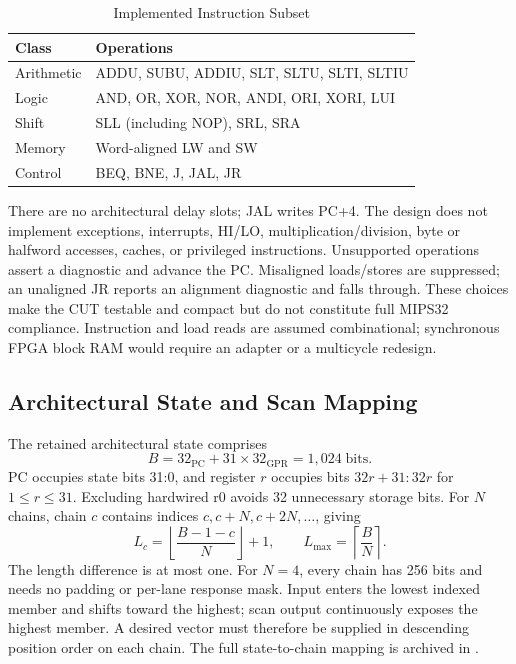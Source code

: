 \documentclass[conference,a4paper]{IEEEtran}
\newcommand{\rtl}[1]{\texttt{\detokenize{#1}}}
\begin{document}
\begin{table}[!t]
\caption{Implemented Instruction Subset}
\label{tab:isa}\centering\small
\begin{tabular}{@{}p{}p{}@{}}\toprule
Class & Operations \\\midrule
Arithmetic & ADDU, SUBU, ADDIU, SLT, SLTU, SLTI, SLTIU \\
Logic & AND, OR, XOR, NOR, ANDI, ORI, XORI, LUI \\
Shift & SLL (including NOP), SRL, SRA \\
Memory & Word-aligned LW and SW \\
Control & BEQ, BNE, J, JAL, JR \\\bottomrule
\end{tabular}
\end{table}

There are no architectural delay slots; JAL writes PC+4. The design does not
implement exceptions, interrupts, HI/LO, multiplication/division, byte or
halfword accesses, caches, or privileged instructions. Unsupported operations
assert a diagnostic and advance the PC. Misaligned loads/stores are suppressed;
an unaligned JR reports an alignment diagnostic and falls through. These choices
make the CUT testable and compact but do not constitute full MIPS32 compliance.
Instruction and load reads are assumed combinational; synchronous FPGA block
RAM would require an adapter or a multicycle redesign.

\subsection{Architectural State and Scan Mapping}
The retained architectural state comprises
\begin{equation}
 B=32_{\mathrm{PC}}+31\times32_{\mathrm{GPR}}=1,024\;\mathrm{bits}.
\end{equation}
PC occupies state bits 31:0, and register $r$ occupies bits $32r+31:32r$ for
$1\leq r\leq31$. Excluding hardwired r0 avoids 32 unnecessary storage bits.
For $N$ chains, chain $c$ contains indices $c,c+N,c+2N,\ldots$, giving
\begin{equation}
 L_c=\left\lfloor\frac{B-1-c}{N}\right\rfloor+1,
 \qquad L_{\max}=\left\lceil\frac{B}{N}\right\rceil.
\label{eq:partition}
\end{equation}
The length difference is at most one. For $N=4$, every chain has 256 bits and
needs no padding or per-lane response mask. Input enters the lowest indexed
member and shifts toward the highest; scan output continuously exposes the
highest member. A desired vector must therefore be supplied in descending
position order on each chain. The full state-to-chain mapping is archived in
\rtl{scan_map_4chains.csv}.
\end{document}
